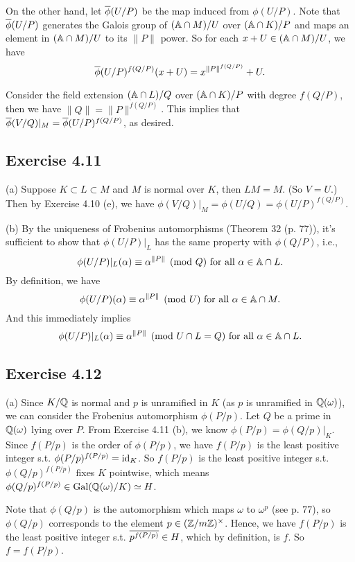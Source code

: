 \documentclass[../Marcus.tex]{subfiles}
\begin{document}
On the other hand, let $\ovl{\phi}(U/P)$ be the map induced from $\phi(U/P)$. Note that $\ovl{\phi}(U/P)$ generates the Galois group of $(\AA \cap M)/U$ over $(\AA \cap K)/P$ and maps an element in $(\AA \cap M)/U$ to its $\|P\|$ power. So for each $x+U \in (\AA \cap M)/U$, we have
$$
\ovl{\phi}(U/P)^{f(Q/P)}(x+U)=x^{\|P\|^{f(Q/P)}}+U.
$$

Consider the field extension $(\AA \cap L)/Q$ over $(\AA \cap K)/P$ with degree $f(Q/P)$, then we have $\|Q\|=\|P\|^{f(Q/P)}$. This implies that $\ovl{\phi}(V/Q)|_M=\ovl{\phi}(U/P)^{f(Q/P)}$, as desired.

\subsection*{Exercise 4.11}

(a) Suppose $K\subset L\subset M$ and $M$ is normal over $K$, then $LM=M$. (So $V=U$.) Then by Exercise 4.10 (e), we have $\phi(V/Q)|_M=\phi(U/Q)=\phi(U/P)^{f(Q/P)}$.

(b) By the uniqueness of Frobenius automorphisms (Theorem 32 (p. 77)), it's sufficient to show that $\phi(U/P)|_L$ has the same property with $\phi(Q/P)$, i.e.,
$$
\phi(U/P)|_L(\alpha)\equiv\alpha^{\|P\|} \pmod{Q} \text{ for all } \alpha\in \AA \cap L.
$$
By definition, we have
$$
\phi(U/P)(\alpha)\equiv\alpha^{\|P\|} \pmod{U} \text{ for all } \alpha\in \AA \cap M.
$$
And this immediately implies
$$
\phi(U/P)|_L(\alpha)\equiv\alpha^{\|P\|} \pmod{U \cap L = Q} \text{ for all } \alpha\in \AA \cap L.
$$

\subsection*{Exercise 4.12}

(a) Since $K/\QQ$ is normal and $p$ is unramified in $K$ (as $p$ is unramified in $\QQ(\omega)$), we can consider the Frobenius automorphism $\phi(P/p)$. Let $Q$ be a prime in $\QQ(\omega)$ lying over $P$. From Exercise 4.11 (b), we know $\phi(P/p)=\phi(Q/p)|_K$. Since $f(P/p)$ is the order of $\phi(P/p)$, we have $f(P/p)$ is the least positive integer s.t. $\phi(P/p)^{f(P/p)}=\id_K$. So $f(P/p)$ is the least positive integer s.t. $\phi(Q/p)^{f(P/p)}$ fixes $K$ pointwise, which means $\phi(Q/p)^{f(P/p)} \in \Gal(\QQ(\omega)/K) \simeq H$.

Note that $\phi(Q/p)$ is the automorphism which maps $\omega$ to $\omega^p$ (see p. 77), so $\phi(Q/p)$ corresponds to the element $p\in(\ZZ/m\ZZ)^\times$. Hence, we have $f(P/p)$ is the least positive integer s.t. $\ovl{p^{f(P/p)}}\in H$, which by definition, is $f$. So $f=f(P/p)$.
\end{document}
